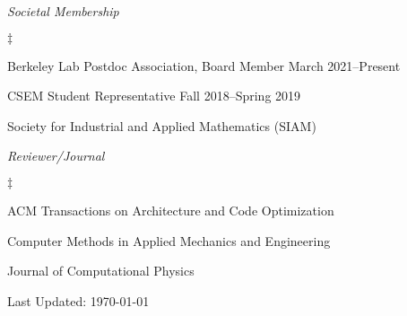 \documentclass[margin,line]{res}
\newenvironment{list2}{
  \begin{list}{$\ddagger$}{%
      \setlength{\itemsep}{0in}
      \setlength{\parsep}{0in} \setlength{\parskip}{0in}
      \setlength{\topsep}{0in} \setlength{\partopsep}{0in}
      \setlength{\leftmargin}{0.2in}}}{\end{list}}
\begin{document}
\begin{resume}
\textit{Societal Membership}
\vspace{0.05in}
\begin{list2}
\item Berkeley Lab Postdoc Association, Board Member \hfill March 2021--Present
\item CSEM Student Representative \hfill Fall 2018--Spring 2019
\item Society for Industrial and Applied Mathematics (SIAM)
\end{list2}

\textit{Reviewer/Journal}
\vspace{0.05in}
\begin{list2}
\item ACM Transactions on Architecture and Code Optimization
\item Computer Methods in Applied Mechanics and Engineering
\item Journal of Computational Physics
\end{list2}
\end{resume}
\vfill
\centerline{Last Updated: \today}
\end{document}
